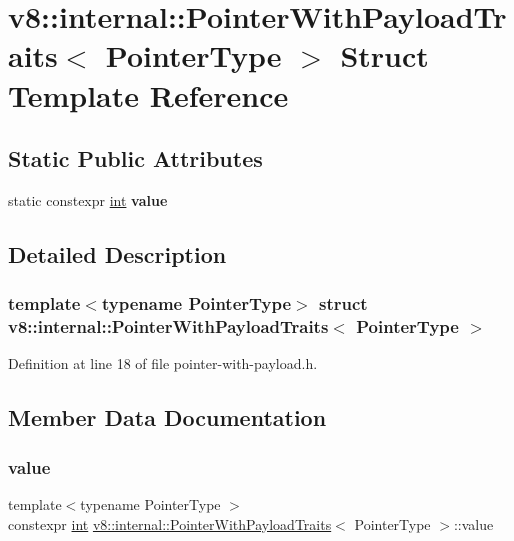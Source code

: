 \hypertarget{structv8_1_1internal_1_1PointerWithPayloadTraits}{}\section{v8\+:\+:internal\+:\+:Pointer\+With\+Payload\+Traits$<$ Pointer\+Type $>$ Struct Template Reference}
\label{structv8_1_1internal_1_1PointerWithPayloadTraits}
\subsection*{Static Public Attributes}
\begin{DoxyCompactItemize}
\item 
static constexpr \mbox{\hyperlink{classint}{int}} {\bfseries value}
\end{DoxyCompactItemize}


\subsection{Detailed Description}
\subsubsection*{template$<$typename Pointer\+Type$>$\newline
struct v8\+::internal\+::\+Pointer\+With\+Payload\+Traits$<$ Pointer\+Type $>$}



Definition at line 18 of file pointer-\/with-\/payload.\+h.



\subsection{Member Data Documentation}
\mbox{\label{structv8_1_1internal_1_1PointerWithPayloadTraits_aedcea6175d31ed6be203e00014aad875}} 
\subsubsection{\texorpdfstring{value}{value}}
{\footnotesize\ttfamily template$<$typename Pointer\+Type $>$ \\
constexpr \mbox{\hyperlink{classint}{int}} \mbox{\hyperlink{structv8_1_1internal_1_1PointerWithPayloadTraits}{v8\+::internal\+::\+Pointer\+With\+Payload\+Traits}}$<$ Pointer\+Type $>$\+::value\hspace{0.3cm}{\ttfamily [static]}}

